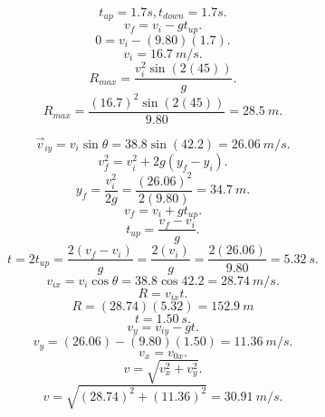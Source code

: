 \documentclass[11pt]{homework}
\begin{document}
\question
\[
    t_{up}=1.7s, t_{down}=1.7s
.\] \[
v_f=v_i-gt_{up}
.\] \[
0=v_i-(9.80)(1.7)
.\] \[
v_i=\qty{16.7}{m/s}
.\] \[
R_{max}=\frac{v_i^2\sin(2(45))}{g}
.\]  \[
R_{max}=\frac{(16.7)^2\sin(2(45))}{9.80} = \boxed{\qty{28.5}{m}}
.\] 
\question
\begin{alphaparts}
    \questionpart
    \[
        \vec{v}_{iy}=v_i\sin\theta=38.8\sin(42.2)=\qty{26.06}{m/s}
    .\] \[
    v_f^2=v_i^2+2g(y_f-y_i)
    .\] \[
    y_f=\frac{v_i^2}{2g}=\frac{(26.06)^2}{2(9.80)}=\boxed{\qty{34.7}{m}}
    .\] 
    \questionpart
    \[
        v_f=v_i+gt_{up}
    .\] \[
    t_{up}=\frac{v_f-v_i}{g}
    .\] \[
    t=2t_{up}=\frac{2(v_f-v_i)}{g}=\frac{2(v_i)}{g}=\frac{2(26.06)}{9.80}=\boxed{\qty{5.32}{s}}
    .\] 
    \questionpart
    \[
        v_{ix}=v_i\cos\theta=38.8\cos42.2=\qty{28.74}{m/s}
    .\] \[
    R=v_{ix}t
    .\] \[
    R=(28.74)(5.32)=\boxed{\qty{152.9}{m}}
    \]
    \questionpart
    \[
        t=\qty{1.50}{s}
    .\] \[
    v_y=v_{iy}-gt
    .\] \[
    v_y=(26.06)-(9.80)(1.50)=\qty{11.36}{m/s}
    .\] \[
    v_x=v_{0x}
    .\] \[
    v=\sqrt{v_x^2+v_y^2} 
    .\] \[
    v=\sqrt{(28.74)^2+(11.36)^2}=\boxed{\qty{30.91}{m/s}} 
    .\] 

\end{alphaparts}
\end{document}
